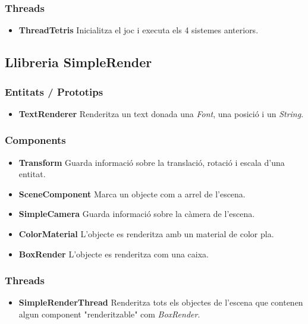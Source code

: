   \subsubsection{Threads}
  
    \begin{itemize}
      \item {\bf ThreadTetris}
        Inicialitza el joc i executa els 4 sistemes anteriors.
        
    \end{itemize}
  
\subsection{Llibreria SimpleRender}

  \subsubsection{Entitats / Prototips}

    \begin{itemize}
      \item {\bf TextRenderer}
        Renderitza un text donada una {\em Font}, una posició i un {\em String}.
    \end{itemize}


  \subsubsection{Components}

    \begin{itemize}
      \item {\bf Transform}
        Guarda informació sobre la translació, rotació i escala d'una entitat.
        
      \item {\bf SceneComponent}
        Marca un objecte com a arrel de l'escena.
        
      \item {\bf SimpleCamera}
        Guarda informació sobre la càmera de l'escena.
        
      \item {\bf ColorMaterial}
        L'objecte es renderitza amb un material de color pla.
        
      \item {\bf BoxRender}
        L'objecte es renderitza com una caixa.
        
    \end{itemize}
    
  \subsubsection{Threads}
  
    \begin{itemize}
      \item {\bf SimpleRenderThread}
        Renderitza tots els objectes de l'escena que contenen algun component "renderitzable" com {\em BoxRender}.
        
    \end{itemize}